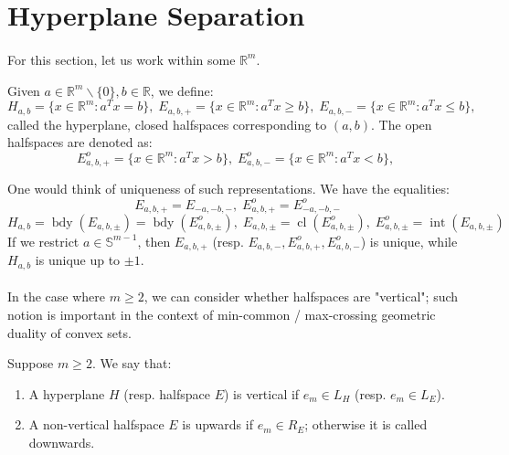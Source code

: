\section{Hyperplane Separation}
\label{sect:015}
\paragraph{}For this section, let us work within some $\mathbb{R}^m$.

\begin{defn}\label{defn:015-hyperplanes-halfspaces}
	Given $a\in \mathbb{R}^{m}\smallsetminus \{0\},b\in \mathbb{R}$, we define:
	\[
		H_{a,b}=\{x\in \mathbb{R}^m:a^Tx=b\},\;
		E_{a,b,+}=\{x\in \mathbb{R}^m:a^Tx\geq b\},\;
		E_{a,b,-}=\{x\in \mathbb{R}^m:a^Tx\leq b\},\;
	\]
	called the hyperplane, closed halfspaces corresponding to $(a,b)$. The open halfspaces are denoted as:
	\[
		E_{a,b,+}^o=\{x\in \mathbb{R}^m:a^Tx> b\},\;
		E_{a,b,-}^o=\{x\in \mathbb{R}^m:a^Tx< b\},\;
	\]
\end{defn}

\begin{rmrk}
	One would think of uniqueness of such representations. We have the equalities:
	\[
		E_{a,b,+}=E_{-a,-b,-},\;E^o_{a,b,+}=E^o_{-a,-b,-}
	\]
	\[
		H_{a,b}=\operatorname{bdy}(E_{a,b,\pm})=\operatorname{bdy}(E_{a,b,\pm}^o),\;
		E_{a,b,\pm}=\operatorname{cl}(E_{a,b,\pm}^o),\;
		E^o_{a,b,\pm}=\operatorname{int}(E_{a,b,\pm})
	\]
	If we restrict $a\in \mathbb{S}^{m-1}$, then $E_{a,b,+}$ (resp. $E_{a,b,-},E_{a,b,+}^o,E_{a,b,-}^o$) is unique, while $H_{a,b}$ is unique up to $\pm 1$.
\end{rmrk}

\paragraph{}In the case where $m\geq 2$, we can consider whether halfspaces are "vertical"; such notion is important in the context of min-common / max-crossing geometric duality of convex sets.

\begin{defn}\label{defn:015-verticality}
	Suppose $m\geq 2$. We say that:
	\begin{enumerate}[label=(\alph*)]
		\item A hyperplane $H$ (resp. halfspace $E$) is vertical if $e_m\in L_H$ (resp. $e_m\in L_E$).
		\item A non-vertical halfspace $E$ is upwards if $e_m\in R_E$; otherwise it is called downwards.
	\end{enumerate}
\end{defn}

